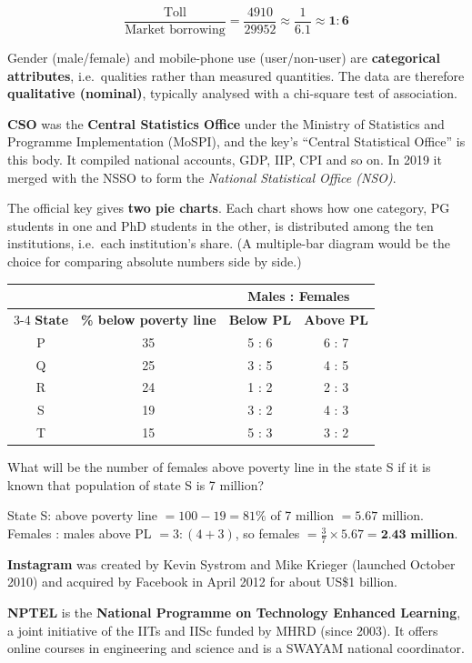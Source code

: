 \[\frac{\text{Toll}}{\text{Market borrowing}}=\frac{4910}{29952}\approx\frac{1}{6.1}\approx\mathbf{1:6}\]

Gender (male/female) and mobile-phone use (user/non-user) are \textbf{categorical attributes}, i.e.\ qualities rather than measured quantities. The data are therefore \textbf{qualitative (nominal)}, typically analysed with a chi-square test of association.

\textbf{CSO} was the \textbf{Central Statistics Office} under the Ministry of Statistics and Programme Implementation (MoSPI), and the key's ``Central Statistical Office'' is this body. It compiled national accounts, GDP, IIP, CPI and so on. In 2019 it merged with the NSSO to form the \emph{National Statistical Office (NSO)}.

The official key gives \textbf{two pie charts}. Each chart shows how one category, PG students in one and PhD students in the other, is distributed among the ten institutions, i.e.\ each institution's share. (A multiple-bar diagram would be the choice for comparing absolute numbers side by side.)

\small
\begin{tabular}{c c cc}\toprule
& & \multicolumn{2}{c}{\textbf{Males : Females}}\\\cmidrule(l){3-4}
\textbf{State} & \textbf{\% below poverty line} & \textbf{Below PL} & \textbf{Above PL}\\\midrule
P & 35 & 5 : 6 & 6 : 7\\ Q & 25 & 3 : 5 & 4 : 5\\ R & 24 & 1 : 2 & 2 : 3\\ S & 19 & 3 : 2 & 4 : 3\\ T & 15 & 5 : 3 & 3 : 2\\\bottomrule
\end{tabular}

What will be the number of females above poverty line in the state S if it is known that population of state S is 7 million?

State S: above poverty line $=100-19=81\%$ of 7 million $=5.67$ million.
Females : males above PL $=3:(4+3)$, so females $=\tfrac37\times5.67=\textbf{2.43 million}$.

\textbf{Instagram} was created by Kevin Systrom and Mike Krieger (launched October 2010) and acquired by Facebook in April 2012 for about US\$1 billion.

\textbf{NPTEL} is the \textbf{National Programme on Technology Enhanced Learning}, a joint initiative of the IITs and IISc funded by MHRD (since 2003). It offers online courses in engineering and science and is a SWAYAM national coordinator.

